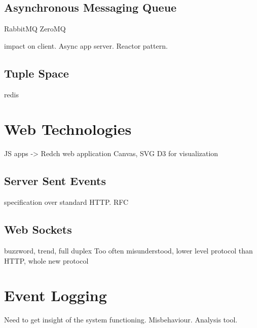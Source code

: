 \subsection{Asynchronous Messaging Queue}
RabbitMQ
ZeroMQ

impact on client. Async app server. Reactor pattern.

\subsection{Tuple Space}
redis

\section{Web Technologies}
JS apps -> Redch web application 
Canvas, SVG
D3 for visualization

\subsection{Server Sent Events}
specification over standard HTTP. RFC

\subsection{Web Sockets}
buzzword, trend, full duplex
Too often misunderstood, lower level protocol than HTTP, whole new protocol

\section{Event Logging}
Need to get insight of the system functioning. Misbehaviour. Analysis tool.